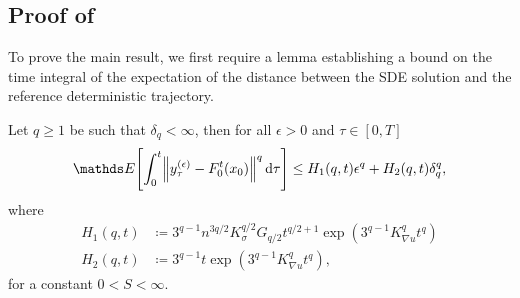 \subsection{Proof of }\label{app:main_thm_proof}
To prove the main result, we first require a lemma establishing a bound on the time integral of the expectation of the distance between the SDE solution and the reference deterministic trajectory.

\begin{lemma}\label{lem:z_int_bound}
	Let \(q \geq 1\) be such that \(\delta_q < \infty\), then for all \(\epsilon > 0\) and \(\tau \in [0,T]\)
	\begin{equation*}
		\avg{\int_0^t{\norm{y_\tau^{(\epsilon)} - F_0^t\!\left(x_0\right)}^q\dif\tau}} \leq H_1(q,t)\epsilon^q + H_2(q,t)\delta_q^q,
	\end{equation*}
	where
	\begin{align*}
		H_1(q,t) & \coloneqq 3^{q-1} n^{3q/2} K_{\sigma}^{q/2} G_{q/2} t^{q/2 + 1}\exp\left(3^{q-1} K_{\nabla u}^q t^q\right) \\
		H_2(q,t) & \coloneqq 3^{q-1} t \exp\left(3^{q-1} K_{\nabla u}^q t^q\right),
	\end{align*}
	for a constant \(0 < S < \infty\).
\end{lemma}


